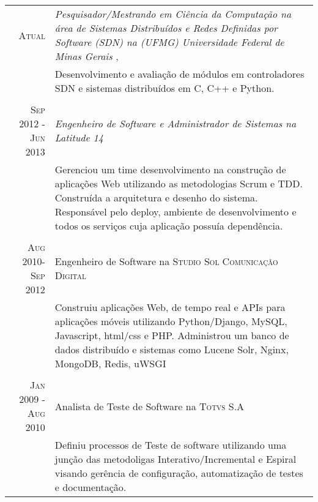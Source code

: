 \documentclass[a4paper,10pt]{article} %
\begin{document}
\begin{tabular}{r|p{11cm}}

\textsc{Atual} & \emph{ Pesquisador/Mestrando em Ciência da Computação na
área de Sistemas Distribuídos e Redes Definidas por Software (SDN) 
na (UFMG) Universidade Federal de Minas Gerais }, \\ 
& \footnotesize{Desenvolvimento e avaliação de módulos em controladores SDN
e sistemas distribuídos em C, C++ e Python.} \\
\multicolumn{2}{c}{} \\

\textsc{Sep 2012 - Jun 2013} & \emph{Engenheiro de Software e Administrador 
de Sistemas na Latitude 14} \\ 
& \footnotesize{Gerenciou um time desenvolvimento na construção de 
aplicações Web utilizando as metodologias Scrum e TDD.
Construída a arquitetura e desenho do sistema.
Responsável pelo deploy, ambiente de desenvolvimento e todos 
os serviços cuja aplicação possuía dependência. } \\
\multicolumn{2}{c}{} \\


\textsc{Aug 2010-Sep 2012} & Engenheiro de Software na \textsc{Studio Sol
Comunicação Digital}  \\
& \footnotesize{Construiu aplicações Web, de tempo real e 
APIs para aplicações móveis utilizando Python/Django, MySQL, 
Javascript, html/css e PHP.
Administrou um banco de dados distribuído e sistemas como 
Lucene Solr, Nginx, MongoDB, Redis, uWSGI}\\
\multicolumn{2}{c}{} \\


\textsc{Jan 2009 - Aug 2010} & Analista de Teste de Software
na \textsc{Totvs S.A} \\
& \footnotesize{Definiu processos de Teste de software utilizando uma
junção das metodoligas Interativo/Incremental e Espiral visando 
gerência de configuração, automatização de testes e documentação.}
\end{tabular}




\end{document}
